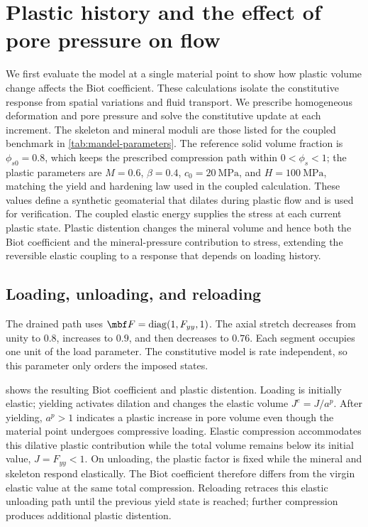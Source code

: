 \section{Plastic history and the effect of pore pressure on flow}
\label{sec:poroplastic-demonstration}

We first evaluate the model at a single material point to show how plastic
volume change affects the Biot coefficient.  These calculations isolate the
constitutive response from spatial variations and fluid transport.  We prescribe homogeneous deformation
and pore pressure and solve the constitutive update at each increment.
The skeleton and mineral moduli are those listed for the coupled benchmark
in \cref{tab:mandel-parameters}.  The reference solid volume fraction is
\(\phi_{s0}=0.8\), which keeps the prescribed compression path within
\(0<\phi_s<1\); the plastic parameters are
\(M=0.6\), \(\beta=0.4\), \(c_0=20\ \mathrm{MPa}\), and
\(H=100\ \mathrm{MPa}\), matching the yield and hardening law used in the
coupled calculation. These values define a synthetic
geomaterial that dilates during plastic flow and is used for verification.
The coupled elastic energy supplies the stress at each current plastic
state.  Plastic distention changes the mineral volume and hence both the
Biot coefficient and the mineral-pressure contribution to stress, extending
the reversible elastic coupling to a response that depends on loading history.

\subsection{Loading, unloading, and reloading}

The drained path uses \(\mbf F=\operatorname{diag}(1,F_{yy},1)\).
The axial stretch decreases from unity to \(0.8\), increases to \(0.9\),
and then decreases to \(0.76\).  Each segment occupies one unit of the load
parameter.  The constitutive model is rate independent, so this parameter
only orders the imposed states.

 shows the resulting Biot coefficient
and plastic distention. Loading is initially elastic; yielding activates
dilation and changes the elastic
volume \(J^e=J/a^p\).  After yielding, \(a^p>1\) indicates a plastic
increase in pore volume even though the material point undergoes compressive
loading.  Elastic compression accommodates this dilative plastic contribution
while the total volume remains below its initial value, \(J=F_{yy}<1\).
On unloading, the plastic factor is fixed while the
mineral and skeleton respond elastically.  The Biot coefficient therefore
differs from the virgin elastic value at the same total compression.  Reloading
retraces this elastic unloading path until the previous yield state is reached;
further compression produces additional plastic distention.


